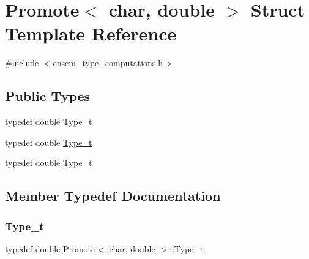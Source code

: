 \hypertarget{structPromote_3_01char_00_01double_01_4}{}\section{Promote$<$ char, double $>$ Struct Template Reference}
\label{structPromote_3_01char_00_01double_01_4}


{\ttfamily \#include $<$ensem\+\_\+type\+\_\+computations.\+h$>$}

\subsection*{Public Types}
\begin{DoxyCompactItemize}
\item 
typedef double \mbox{\hyperlink{structPromote_3_01char_00_01double_01_4_ac5f86ae4e12f2be8737cfb818bd7d82d}{Type\+\_\+t}}
\item 
typedef double \mbox{\hyperlink{structPromote_3_01char_00_01double_01_4_ac5f86ae4e12f2be8737cfb818bd7d82d}{Type\+\_\+t}}
\item 
typedef double \mbox{\hyperlink{structPromote_3_01char_00_01double_01_4_ac5f86ae4e12f2be8737cfb818bd7d82d}{Type\+\_\+t}}
\end{DoxyCompactItemize}


\subsection{Member Typedef Documentation}
\mbox{\label{structPromote_3_01char_00_01double_01_4_ac5f86ae4e12f2be8737cfb818bd7d82d}} 
\subsubsection{\texorpdfstring{Type\_t}{Type\_t}\hspace{0.1cm}{\footnotesize\ttfamily [1/3]}}
{\footnotesize\ttfamily typedef double \mbox{\hyperlink{structPromote}{Promote}}$<$ char, double $>$\+::\mbox{\hyperlink{structPromote_3_01char_00_01double_01_4_ac5f86ae4e12f2be8737cfb818bd7d82d}{Type\+\_\+t}}}

\mbox{\label{structPromote_3_01char_00_01double_01_4_ac5f86ae4e12f2be8737cfb818bd7d82d}} 
